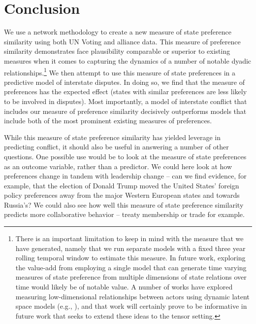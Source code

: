 \section*{Conclusion}

We use a network methodology to create a new measure of state preference similarity using both UN Voting and alliance data. This measure of preference similarity demonstrates face plausibility comparable or superior to existing measures when it comes to capturing the dynamics of a number of notable dyadic relationships.\footnote{There is an important limitation to keep in mind with the measure that we have generated, namely that we run separate models with a fixed three year rolling temporal window to estimate this measure. In future work, exploring the value-add from employing a single model that can generate time varying measures of state preference from multiple dimensions of state relations over time would likely be of notable value. A number of works have explored measuring low-dimensional relationships between actors using dynamic latent space models (e.g., \citealp{sewell:chen:2015}), and that work will certainly prove to be informative in future work that seeks to extend these ideas to the tensor setting.}  We then attempt to use this measure of state preferences in a predictive model of interstate disputes. In doing so, we find that the measure of preferences has the expected effect (states with similar preferences are less likely to be involved in disputes). Most importantly, a model of interstate conflict that includes our measure of preference similarity decisively outperforms models that include both of the most prominent existing measures of preferences.

While this measure of state preference similarity has yielded leverage in predicting conflict, it should also be useful in answering a number of other questions. One possible use would be to look at the measure of state preferences as an outcome variable, rather than a predictor. We could here look at how preferences change in tandem with leadership change -- can we find evidence, for example, that the election of Donald Trump moved the United States' foreign policy preferences away from the major Western European states and towards Russia's? We could also see how well this measure of state preference similarity predicts more collaborative behavior -- treaty membership or trade for example.

